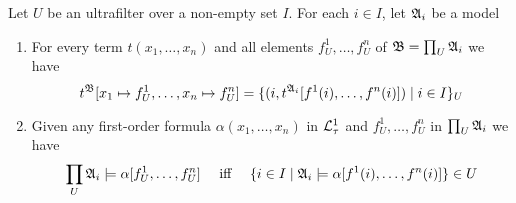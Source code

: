 \documentclass[11pt]{article}
\begin{document}
\begin{theorem}
Let \(U\) be an ultrafilter over a non-empty set \(I\). For each \(i\in I\),
let \(\mathfrak{A}_i\) be a model
\begin{enumerate}
\item For every term \(t(x_1,\dots,x_n)\) and all elements
\(f_U^1,\dots,f_U^n\) of \(\mathfrak{B}=\prod_U\mathfrak{A}_i\) we have
\begin{equation*}
t^{\mathfrak{B}}[x_1\mapsto f_U^1,\dots,x_n\mapsto f_U^n]=
\{(i,t^{\mathfrak{A}_i}[f^1(i),\dots,f^n(i)])\mid i\in I\}_U
\end{equation*}
\item Given any first-order formula \(\alpha(x_1,\dots,x_n)\) in \(\mathcal{L}_\tau^1\)
and \(f_U^1,\dots,f_U^n\) in \(\prod_U\mathfrak{A}_i\) we have
\begin{equation*}
\prod_U\mathfrak{A}_i\models\alpha[f_U^1,\dots,f_U^n]
\quad\text{ iff }\quad
\{i\in I\mid\mathfrak{A}_i\models\alpha[f^1(i),\dots,f^n(i)]\}\in U
\end{equation*}
\end{enumerate}
\end{theorem}
\end{document}
